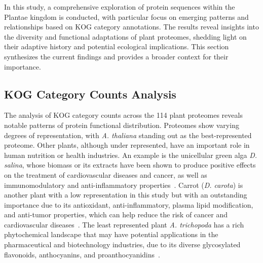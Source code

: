 

In this study, a comprehensive exploration of protein 
sequences within the Plantae kingdom is conducted, with 
particular focus on emerging patterns and relationships 
based on KOG category annotations. The results reveal 
insights into the diversity and functional adaptations of 
plant proteomes, shedding light on their adaptive history 
and potential ecological implications. This section 
synthesizes the current findings and provides a broader 
context for their importance.


\subsection{KOG Category Counts Analysis}
\label{sec:conclusion.kogcount}

The analysis of KOG category counts across the 114 plant 
proteomes reveals notable patterns of protein functional 
distribution. Proteomes show varying degrees of 
representation, with \emph{A. thaliana} standing out as 
the best-represented proteome. Other plants, although under 
represented, have an important role in human nutrition or 
health industries. An example is the unicellular green 
alga \emph{D. salina}, whose 
biomass or its extracts have been shown to produce 
positive effects on the treatment of cardiovascular 
diseases and cancer, as well as immunomodulatory and 
anti-inflammatory properties~\citep{hyrslova2022}. 
Carrot (\emph{D. carota}) is another plant 
with a low representation in this study but with an 
outstanding importance due to its antioxidant, 
anti-inflammatory, plasma lipid modification, and 
anti-tumor properties, which can help reduce the risk of 
cancer and cardiovascular diseases~\citep{ahmad2019}. The 
least represented plant \emph{A. trichopoda} has a rich 
phytochemical landscape that may have potential applications 
in the pharmaceutical and biotechnology industries, due to 
its diverse glycosylated flavonoids, anthocyanins, and 
proanthocyanidins~\citep{wu2019}. 

